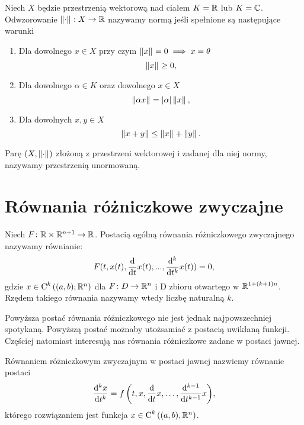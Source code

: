 \documentclass[12pt,a4paper]{report}
\begin{document}
\begin{definition}
Niech $X$ będzie przestrzenią wektorową nad ciałem $K =\setR $ lub $ K = \setC $. Odwzorowanie $\norm{\cdot}: X \to \setR$ nazywamy normą jeśli spełnione są następujące warunki 
\begin{enumerate}
\item Dla dowolnego $x\in X$ przy czym  $  \norm{x} = 0 \implies x = \theta$
$$
\norm{x} \geq 0 ,
$$
\item Dla dowolnego $\alpha \in K$ oraz dowolnego $x \in X$ 
$$
\norm{\alpha x}  = \abs{\alpha}  \norm{x},
$$
\item Dla dowolnych $x,y\in X$
$$
 \norm{x+y} \leq \norm{x} + \norm{y}.
$$
\end{enumerate}
Parę $ (X, \norm{\cdot})$ złożoną z przestrzeni wektorowej i zadanej dla niej normy, nazywamy przestrzenią unormowaną. 
\end{definition}

\section{Równania różniczkowe zwyczajne}

\begin{definition}
Niech $F \colon \setR \times \setR^{n+1} \to \setR$. Postacią ogólną równania różniczkowego zwyczajnego nazywamy równianie: 
\begin{equation*}
F(t, x(t), \ddx{t} x(t),..., \ddx[^k]{t^k} x(t) ) = 0,
\end{equation*}
gdzie $x \in \Ck{k}{(a,b); \setR^n}$ dla $F \colon D \to \setR^n$ i D zbioru otwartego w $\setR^{1+(k+1)n}$. 
Rzędem takiego równania nazywamy wtedy liczbę naturalną $k$. 
\end{definition}

Powyższa postać równania różniczkowego nie jest jednak najpowszechniej spotykaną. Powyższą postać możnaby utożsamiać z postacią uwikłaną funkcji. Częściej natomiast interesują nas równania różniczkowe zadane w postaci jawnej.

\begin{definition}
Równaniem różniczkowym zwyczajnym w postaci jawnej nazwiemy równanie postaci
$$
\ddx[{^k x}]{t^k} = \function{f}{t,x,\ddx{t}x, \ldots, \ddx[{^{k-1}}]{t^{k-1}} x},
$$
którego rozwiązaniem jest funkcja $x \in \Ck{k}{(a,b), \setR^n}$.
\end{definition}
\end{document}
